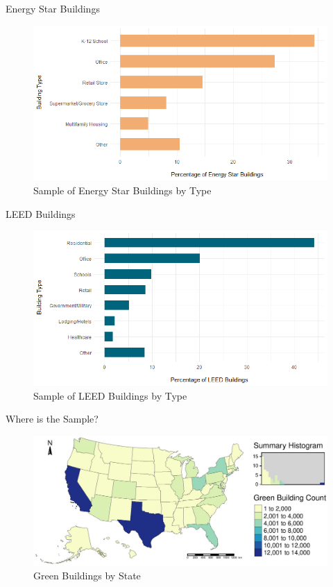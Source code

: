 \documentclass[11pt]{beamer}
\begin{document}

\begin{frame}{Energy Star Buildings}

\begin{figure}
	\caption{Sample of Energy Star Buildings by Type}
	\includegraphics[width=\textwidth]{estar.png}
\end{figure}

\end{frame}


\begin{frame}{LEED Buildings}

\begin{figure}
\caption{Sample of LEED Buildings by Type}
	\includegraphics[width=\textwidth]{leed.png}
\end{figure}

\end{frame}


\begin{frame}{Where is the Sample?}

\begin{figure}
	\caption{Green Buildings by State}
	\includegraphics[width=\textwidth]{usCounts.jpg}
\end{figure}

\end{frame}
\end{document}
